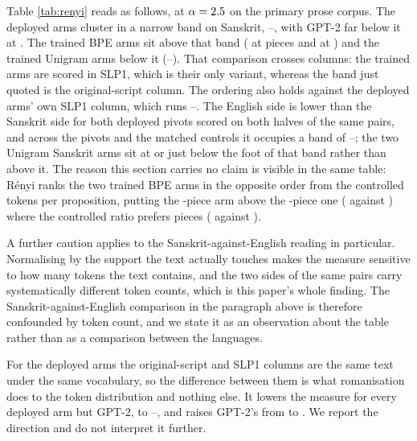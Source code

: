 \documentclass[11pt]{article}
\begin{document}
Table \ref{tab:renyi} reads as follows, at $\alpha = 2.5{}$ on the primary
prose corpus. The deployed arms cluster in a narrow band on Sanskrit,
\numRenyiDeployedLo--\numRenyiDeployedHi, with GPT-2 far below it at \numRenyiGptTwo. The
trained BPE arms sit above that band (\numRenyiBpeThirtyTwo{} at \numVocabSmall{} pieces
and \numRenyiBpeSixtyFour{} at \numVocabLarge) and the trained Unigram arms below it
(\numRenyiUnigramLo--\numRenyiUnigramHi). That comparison crosses columns: the trained
arms are scored in SLP1, which is their only variant, whereas the band just quoted is the
original-script column. The ordering also holds against the deployed arms' own SLP1
column, which runs \numRenyiDeployedSlpOneLo--\numRenyiDeployedSlpOneHi. The English side is lower than the Sanskrit side
for both deployed pivots scored on both halves of the same pairs, and across the pivots
and the matched controls it occupies a band of
\numRenyiEnglishLo--\numRenyiEnglishHi; the two Unigram Sanskrit arms sit at or just
below the foot of that band rather than above it. The reason this section carries no claim is visible in the same
table: R\'enyi ranks the two trained BPE arms in the opposite order from the controlled
tokens per proposition, putting the \numVocabSmall-piece arm above the
\numVocabLarge-piece one (\numRenyiBpeThirtyTwo{} against \numRenyiBpeSixtyFour) where the
controlled ratio prefers \numVocabLarge{} pieces (\numTppControlledBest{} against
\numTppControlledBpeThirtyTwo).

A further caution applies to the Sanskrit-against-English reading in particular.
Normalising by the support the text actually touches makes the measure sensitive to how
many tokens the text contains, and the two sides of the same pairs carry systematically
different token counts, which is this paper's whole finding. The Sanskrit-against-English
comparison in the paragraph above is therefore confounded by token count, and we state it
as an observation about the table rather than as a comparison between the languages.

For the deployed arms the original-script and SLP1 columns are the same text under the
same vocabulary, so the difference between them is what romanisation does to the token
distribution and nothing else. It lowers the measure for every deployed arm but GPT-2, to
\numRenyiDeployedSlpOneLo--\numRenyiDeployedSlpOneHi, and raises GPT-2's from
\numRenyiGptTwo{} to \numRenyiGptTwoSlpOne. We report the direction and do not interpret
it further.


\end{document}
